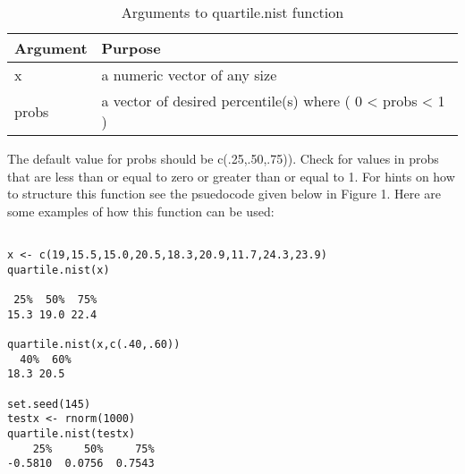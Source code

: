 \documentclass{article}
\begin{document}
\begin{table}[ht]
\caption{Arguments to quartile.nist function}
\begin{tabular}{l | l}
\hline\hline
Argument & Purpose \\ [1ex]
\hline
x & a numeric vector of any size \\ [1ex]
\hline 
probs & a vector of desired percentile(s) where ( 0 < probs < 1 ) \\ 
\hline
\end{tabular}
\label{table:nonlin}
\end{table}

The default value for probs should be c(.25,.50,.75)). Check for values in probs that are less than or equal to zero or greater than or equal to 1. For hints on how to structure this function see the psuedocode given below in Figure 1.  Here are some examples of how this function can be used:
\begin{verbatim}

x <- c(19,15.5,15.0,20.5,18.3,20.9,11.7,24.3,23.9)
quartile.nist(x)

 25%  50%  75% 
15.3 19.0 22.4

quartile.nist(x,c(.40,.60))
  40%  60% 
18.3 20.5 

set.seed(145)
testx <- rnorm(1000)
quartile.nist(testx)
    25%     50%     75% 
-0.5810  0.0756  0.7543

\end{verbatim}
\end{document}
